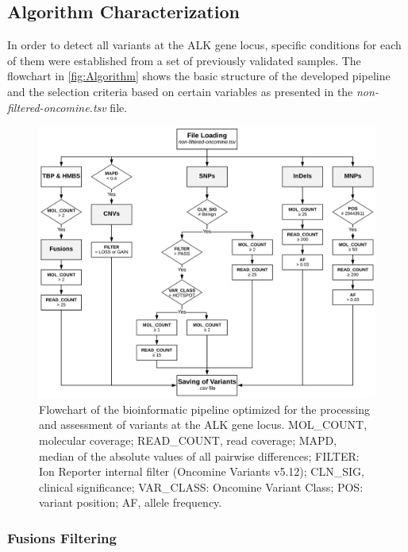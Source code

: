 \subsection{Algorithm Characterization}

In order to detect all variants at the ALK gene locus, specific conditions for each of them were established from a set of previously validated samples. The flowchart in \autoref{fig:Algorithm} shows the basic structure of the developed pipeline and the selection criteria based on certain variables as presented in the \textit{non-filtered-oncomine.tsv} file.

\begin{figure}[ht]
    \centering
    \includegraphics[width=\textwidth]{Images/chapter_4/mut_filtering.png}
    \caption{Flowchart of the bioinformatic pipeline optimized for the processing and assessment of variants at the ALK gene locus. MOL\_COUNT, molecular coverage; READ\_COUNT, read coverage; MAPD, median of the absolute values of all pairwise differences; FILTER: Ion Reporter\texttrademark{} internal filter (Oncomine\texttrademark{} Variants v5.12); CLN\_SIG, clinical significance; VAR\_CLASS: Oncomine\texttrademark{} Variant Class; POS: variant position; AF, allele frequency.}
    \label{fig:Algorithm}
\end{figure}

\subsubsection{Fusions Filtering}

